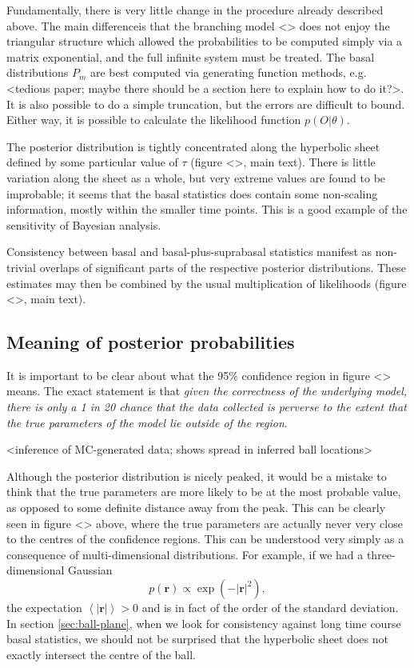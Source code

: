 \documentclass[10pt,UKenglish]{article}
\begin{document}
Fundamentally, there is very little change in the procedure already described above. The main differenceis that the branching model <> does not enjoy the triangular structure which allowed the probabilities to be computed simply via a matrix exponential, and the full infinite system must be treated. The basal distributions $P_m$ are best computed via generating function methods, e.g. <tedious paper; maybe there should be a section here to explain how to do it?>. It is also possible to do a simple truncation, but the errors are difficult to bound. Either way, it is possible to calculate the likelihood function $p(O|\theta)$.

The posterior distribution is tightly concentrated along the hyperbolic sheet defined by some particular value of $\tau$ (figure <>, main text). There is little variation along the sheet as a whole, but very extreme values are found to be improbable; it seems that the basal statistics does contain some non-scaling information, mostly within the smaller time points. This is a good example of the sensitivity of Bayesian analysis.

Consistency between basal and basal-plus-suprabasal statistics manifest as non-trivial overlaps of significant parts of the respective posterior distributions. These estimates may then be combined by the usual multiplication of likelihoods (figure <>, main text).

\subsection{Meaning of posterior probabilities}

It is important to be clear about what the 95\% confidence region in figure <> means. The exact statement is that \emph{given the correctness of the underlying model, there is only a 1 in 20 chance that the data collected is perverse to the extent that the true parameters of the model lie outside of the region}.

<inference of MC-generated data; shows spread in inferred ball locations>

Although the posterior distribution is nicely peaked, it would be a mistake to think that the true parameters are more likely to be at the most probable value, as opposed to some definite distance away from the peak. This can be clearly seen in figure <> above, where the true parameters are actually never very close to the centres of the confidence regions. This can be understood very simply as a consequence of multi-dimensional distributions. For example, if we had a three-dimensional Gaussian $$p(\mathbf{r}) \propto \exp\left(-|\mathbf r|^2\right),$$ the expectation $\left\langle \mathbf |\mathbf r| \right\rangle > 0$ and is in fact of the order of the standard deviation. In section \ref{sec:ball-plane}, when we look for consistency against long time course basal statistics, we should not be surprised that the hyperbolic sheet does not exactly intersect the centre of the ball.
\end{document}
